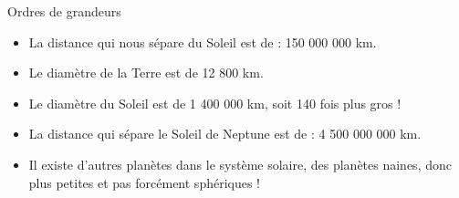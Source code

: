 \documentclass[xcolor={dvipsnames}]{beamer}
\begin{document}
\begin{frame}
\begin{block}{Ordres de grandeurs}
	\begin{itemize}
		\item La distance qui nous sépare du Soleil est de : 150 000 000 km.
		\item Le diamètre de la Terre est de 12 800 km.
		\item Le diamètre du Soleil est de 1 400 000 km, soit 140 fois plus gros !
		\item La distance qui sépare le Soleil de Neptune est de : 
		4 500 000 000 km.
		\item Il existe d’autres planètes dans le système solaire, des planètes naines, donc plus petites et pas forcément sphériques !
		
	\end{itemize}
\end{block}

\end{frame}
\end{document}
